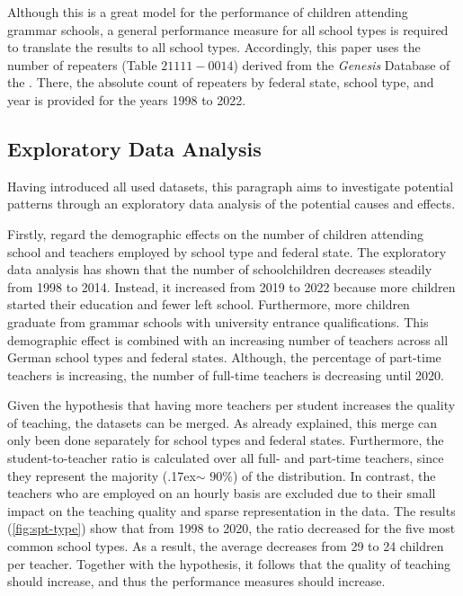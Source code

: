 Although this is a great model for the performance of children attending grammar schools, a general performance measure for all school types is required to translate the results to all school types. Accordingly, this paper uses the number of repeaters (Table $21111-0014$) derived from the \textit{Genesis} Database of the \citeauthor{statistische_bundesamt_statistisches_2023}. There, the absolute count of repeaters by federal state, school type, and year is provided for the years 1998 to 2022.


\subsection{Exploratory Data Analysis}

Having introduced all used datasets, this paragraph aims to investigate potential patterns through an exploratory data analysis of the potential causes and effects. 

Firstly, regard the demographic effects on the number of children attending school and teachers employed by school type and federal state. The exploratory data analysis has shown that the number of schoolchildren decreases steadily from 1998 to 2014. Instead, it increased from 2019 to 2022 because more children started their education and fewer left school. Furthermore, more children graduate from grammar schools with university entrance qualifications. This demographic effect is combined with an increasing number of teachers across all German school types and federal states. Although, the percentage of part-time teachers is increasing, the number of full-time teachers is decreasing until 2020.

Given the hypothesis that having more teachers per student increases the quality of teaching, the datasets can be merged. As already explained, this merge can only been done separately for school types and federal states. Furthermore, the student-to-teacher ratio is calculated over all full- and part-time teachers, since they represent the majority ({\raise.17ex\hbox{$\scriptstyle\mathtt{\sim}$}} $90\%$) of the distribution. In contrast, the teachers who are employed on an hourly basis are excluded due to their small impact on the teaching quality and sparse representation in the data. The results (\autoref{fig:spt-type}) show that from 1998 to 2020, the ratio decreased for the five most common school types. As a result, the average decreases from 29 to 24 children per teacher. Together with the hypothesis, it follows that the quality of teaching should increase, and thus the performance measures should increase.

